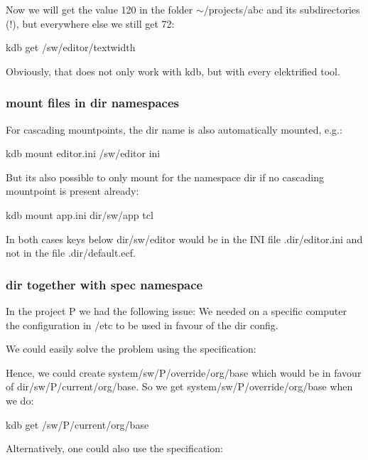 Now we will get the value 120 in the folder $\sim$/projects/abc and its subdirectories (!), but everywhere else we still get 72\+: \begin{DoxyVerb}kdb get /sw/editor/textwidth
\end{DoxyVerb}


Obviously, that does not only work with kdb, but with every elektrified tool.

\subsubsection*{mount files in dir namespaces}

For cascading mountpoints, the dir name is also automatically mounted, e.\+g.\+: \begin{DoxyVerb}kdb mount editor.ini /sw/editor ini
\end{DoxyVerb}


But its also possible to only mount for the namespace dir if no cascading mountpoint is present already\+: \begin{DoxyVerb}kdb mount app.ini dir/sw/app tcl
\end{DoxyVerb}


In both cases keys below dir/sw/editor would be in the I\+N\+I file {\ttfamily .dir/editor.\+ini} and not in the file {\ttfamily .dir/default.\+ecf}.

\subsubsection*{dir together with spec namespace}

In the project P we had the following issue\+: We needed on a specific computer the configuration in /etc to be used in favour of the dir config.

We could easily solve the problem using the specification\+: 


Hence, we could create system/sw/\+P/override/org/base which would be in favour of dir/sw/\+P/current/org/base. So we get system/sw/\+P/override/org/base when we do\+: \begin{DoxyVerb}kdb get /sw/P/current/org/base
\end{DoxyVerb}


Alternatively, one could also use the specification\+: 


